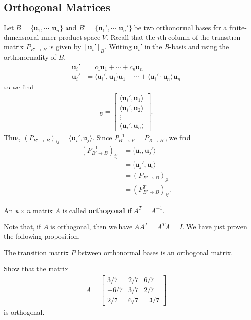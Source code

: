 \documentclass[12pt,letterpaper,reqno]{article}
\numberwithin{equation}{section}
\newcommand{\bu}{\mathbf{u}}
\begin{document}
\subsection{Orthogonal Matrices}
Let $B=\{\bu_1,\cdots,\bu_n\}$ and $B'=\{\bu_1',\cdots,\bu_n'\}$ be two orthonormal bases for a finite-dimensional inner product space $V$. Recall that the $i$th column of the transition matrix $P_{B' \to B}$ is given by $[\bu_i']_B$. Writing $\bu_i'$ in the $B$-basis and using the orthonormality of $B$,
\begin{align*}
	\bu_i'&=c_1\bu_1+\cdots+c_n\bu_n \\
	\bu_i'&=\langle \bu_i',\bu_1\rangle \bu_1+\cdots+\langle \bu_i' \cdot \bu_n\rangle\bu_n
\end{align*}
so we find
\begin{align*}
	[\bu_i']_B=\begin{bmatrix}
		\langle \bu_i', \bu_1 \rangle \\
		\langle \bu_i', \bu_2 \rangle \\
		\vdots \\
		\langle \bu_i', \bu_n \rangle
	\end{bmatrix}.
\end{align*}
Thus, $(P_{B' \to B})_{ij}=\langle\bu_i',\bu_j\rangle$. Since $P_{B' \to B}^{-1}=P_{B \to B'}$, we find 
\begin{align*}
(P_{B' \to B}^{-1})_{ij}&=\langle \bu_i ,\bu_j'\rangle \\
&=\langle\bu_j',\bu_i\rangle \\
&=(P_{B' \to B})_{ji} \\
&=(P_{B' \to B}^T)_{ij}.
\end{align*}
\begin{defn}
	An $n \times n$ matrix $A$ is called {\bf orthogonal} if $A^T=A^{-1}$.
\end{defn}
Note that, if $A$ is orthogonal, then we have $AA^T=A^TA=I$. We have just proven the following proposition.

\begin{prop}
	The transition matrix $P$ between orthonormal bases is an orthogonal matrix.
\end{prop}

\begin{exercise}
	Show that the matrix
	\begin{align*}
		A=\begin{bmatrix}
			3/7 & 2/7 & 6/7 \\
			-6/7 & 3/7 & 2/7 \\
			2/7 & 6/7 & -3/7
		\end{bmatrix}
	\end{align*}
is orthogonal.
\end{exercise}
\end{document}
